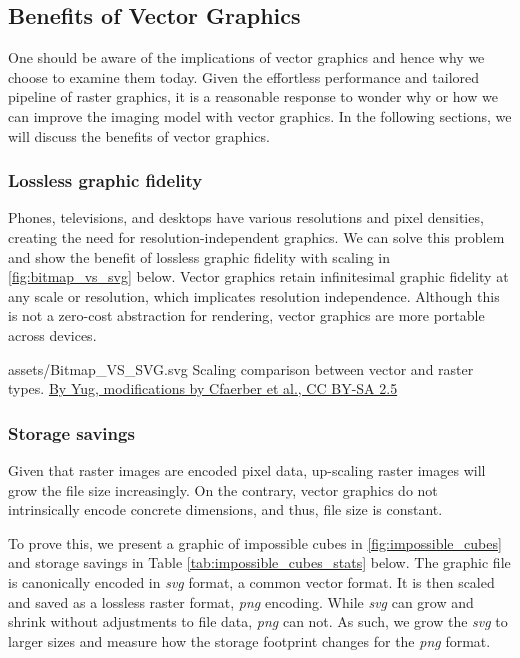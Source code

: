 \subsection{Benefits of Vector Graphics}
One should be aware of the implications of vector graphics and hence why we choose to examine them today. Given the effortless performance and tailored pipeline of raster graphics, it is a reasonable response to wonder why or how we can improve the imaging model with vector graphics. In the following sections, we will discuss the benefits of vector graphics.

\subsubsection{Lossless graphic fidelity}
Phones, televisions, and desktops have various resolutions and pixel densities, creating the need for resolution-independent graphics. We can solve this problem and show the benefit of lossless graphic fidelity with scaling in \cref{fig:bitmap_vs_svg} below. Vector graphics retain infinitesimal graphic fidelity at any scale or resolution, which implicates resolution independence. Although this is not a zero-cost abstraction for rendering, vector graphics are more portable across devices.\medskip

\svg
{assets/Bitmap_VS_SVG.svg}
{\label{fig:bitmap_vs_svg}Scaling comparison between vector and raster types.}
{\href{https://commons.wikimedia.org/w/index.php?curid=1183592}{By Yug, modifications by Cfaerber et al., CC BY-SA 2.5}}\medskip

\subsubsection{Storage savings}\label{sec:storage_savings}
Given that raster images are encoded pixel data, up-scaling raster images will grow the file size increasingly. On the contrary, vector graphics do not intrinsically encode concrete dimensions, and thus, file size is constant.\medskip

To prove this, we present a graphic of impossible cubes in \cref{fig:impossible_cubes} and storage savings in Table \cref{tab:impossible_cubes_stats} below. The graphic file is canonically encoded in \textit{svg} format, a common vector format. It is then scaled and saved as a lossless raster format, \textit{png} encoding. While \textit{svg} can grow and shrink without adjustments to file data, \textit{png} can not. As such, we grow the \textit{svg} to larger sizes and measure how the storage footprint changes for the \textit{png} format.\medskip

